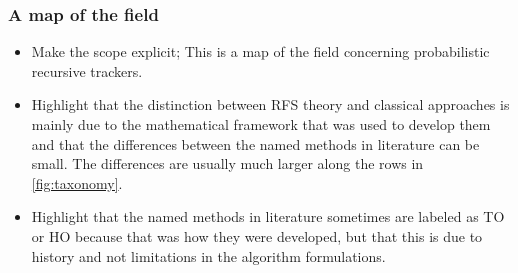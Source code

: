 \subsubsection{A map of the field}
\label{sec:map}

\begin{itemize}
    \item Make the scope explicit; This is a map of the field concerning probabilistic recursive trackers.
    \item Highlight that the distinction between RFS theory and classical approaches is mainly due to the mathematical framework that was used to develop them and that the differences between the named methods in literature can be small. The differences are usually much larger along the rows in \autoref{fig:taxonomy}. 
    \item Highlight that the named methods in literature sometimes are labeled as TO or HO because that was how they were developed, but that this is due to history and not limitations in the algorithm formulations.
\end{itemize}

